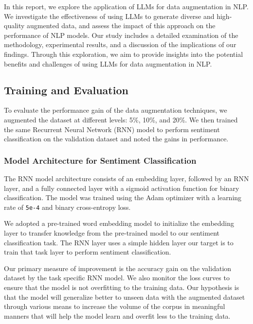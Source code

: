 \documentclass{article}
\newcommand{\code}[1]{\texttt{#1}}
\begin{document}
In this report, we explore the application of LLMs for data augmentation in
NLP. We investigate the effectiveness of using LLMs to generate diverse and
high-quality augmented data, and assess the impact of this approach on the
performance of NLP models. Our study includes a detailed examination of the
methodology, experimental results, and a discussion of the implications of our
findings. Through this exploration, we aim to provide insights into the
potential benefits and challenges of using LLMs for data augmentation in NLP.

\subsection{Training and Evaluation}

To evaluate the performance gain of the data augmentation techniques, we
augmented the dataset at different levels: 5\%, 10\%, and 20\%. We then trained
the same Recurrent Neural Network (RNN) model to perform sentiment
classification on the validation dataset and noted the gains in performance.

\subsubsection{Model Architecture for Sentiment Classification}

The RNN model architecture consists of an embedding layer, followed by an RNN
layer, and a fully connected layer with a sigmoid activation function for
binary classification. The model was trained using the Adam optimizer with a
learning rate of \code{5e-4} and binary cross-entropy loss.

We adopted a pre-trained word embedding model to initialize the embedding layer
to transfer knowledge from the pre-trained model to our sentiment classification
task. The RNN layer uses a simple hidden layer our target is to train that task
layer to perform sentiment classification.


Our primary measure of improvement is the accuracy gain on the validation
dataset by the task specific RNN model. We also monitor the loss curves to
ensure that the model is not overfitting to the training data. Our hypothesis
is that the model will generalize better to unseen data with the augmented
dataset through various means to increase the volume of the corpus in meaningful
manners that will help the model learn and overfit less to the training data.
\end{document}
